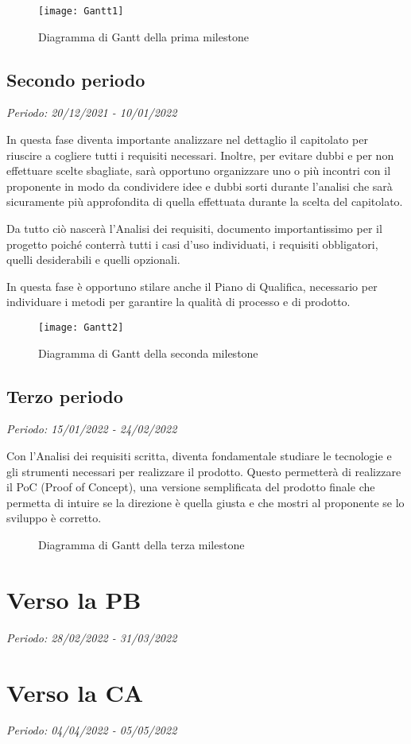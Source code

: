 \begin{figure}[!ht]
    \texttt{[image: Gantt1]}
    \caption{Diagramma di Gantt della prima milestone} 
\end{figure}

\subsection{Secondo periodo}

\textit{Periodo: 20/12/2021 - 10/01/2022}

In questa fase diventa importante analizzare nel dettaglio il capitolato per riuscire a
cogliere tutti i requisiti necessari. Inoltre, per evitare dubbi e per non effettuare
scelte sbagliate, sarà opportuno organizzare uno o più incontri con il proponente in modo da
condividere idee e dubbi sorti durante l'analisi che sarà sicuramente più approfondita di quella
effettuata durante la scelta del capitolato.
\par Da tutto ciò nascerà l'Analisi dei requisiti, documento importantissimo per il progetto poiché
conterrà tutti i casi d'uso individuati, i requisiti obbligatori, quelli desiderabili e quelli opzionali.
\par In questa fase è opportuno stilare anche il Piano di Qualifica, necessario per individuare
i metodi per garantire la qualità di processo e di prodotto.

\begin{figure}[!ht]
    \texttt{[image: Gantt2]}
    \caption{Diagramma di Gantt della seconda milestone} 
\end{figure}

\subsection{Terzo periodo}

\textit{Periodo: 15/01/2022 - 24/02/2022}

Con l'Analisi dei requisiti scritta, diventa fondamentale studiare le tecnologie e gli strumenti necessari
per realizzare il prodotto. Questo permetterà di realizzare il PoC (Proof of Concept), una versione semplificata 
del prodotto finale che permetta di intuire se la direzione è quella giusta e che mostri al proponente se lo 
sviluppo è corretto.

\begin{figure}[!ht]
    \caption{Diagramma di Gantt della terza milestone} 
\end{figure}

\section{Verso la PB}

\textit{Periodo: 28/02/2022 - 31/03/2022}

\section{Verso la CA}

\textit{Periodo: 04/04/2022 - 05/05/2022}